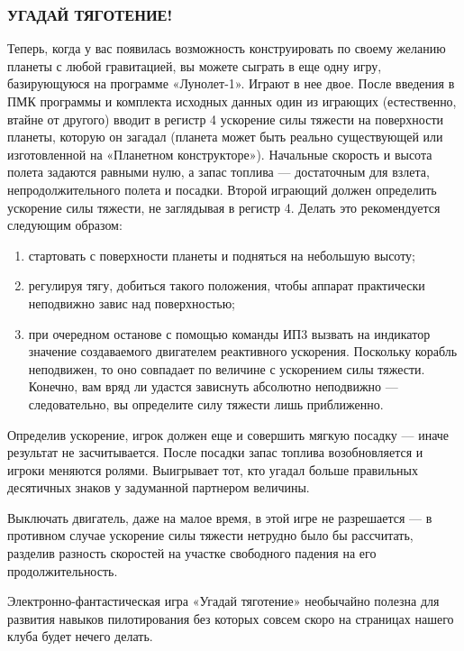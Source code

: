 \documentclass[11pt,a4paper,oneside]{article}
\begin{document}
\subsubsection{УГАДАЙ ТЯГОТЕНИЕ!}

Теперь, когда у вас появилась возможность конструировать по своему желанию планеты с любой гравитацией, вы можете сыграть в еще одну игру, базирующуюся на программе «Лунолет-1». Играют в нее двое. После введения в ПМК программы и комплекта исходных данных один из играющих (естественно, втайне от другого) вводит в регистр 4 ускорение силы тяжести на поверхности планеты, которую он загадал (планета может быть реально существующей или изготовленной на «Планетном конструкторе»). Начальные скорость и высота полета задаются равными нулю, а запас топлива — достаточным для взлета, непродолжительного полета и посадки. Второй играющий должен определить ускорение силы тяжести, не заглядывая в регистр 4. Делать это рекомендуется следующим образом:

\begin{enumerate}
\item стартовать с поверхности планеты и подняться на небольшую высоту; 
\item регулируя тягу, добиться такого положения, чтобы аппарат практически неподвижно завис над поверхностью;
\item при очередном останове с помощью команды ИП3 вызвать на индикатор значение создаваемого двигателем реактивного ускорения. Поскольку корабль неподвижен, то оно совпадает по величине с ускорением силы тяжести. Конечно, вам вряд ли удастся зависнуть абсолютно неподвижно — следовательно, вы определите силу тяжести лишь приближенно. 
\end{enumerate}

Определив ускорение, игрок должен еще и совершить мягкую посадку — иначе результат не засчитывается. После посадки запас топлива возобновляется и игроки меняются ролями. Выигрывает тот, кто угадал больше правильных десятичных знаков у задуманной партнером величины.

Выключать двигатель, даже на малое время, в этой игре не разрешается — в противном случае ускорение силы тяжести нетрудно было бы рассчитать, разделив разность скоростей на участке свободного падения на его продолжительность.

Электронно-фантастическая игра «Угадай тяготение» необычайно полезна для развития навыков пилотирования без которых совсем скоро на страницах нашего клуба будет нечего делать.
\end{document}
